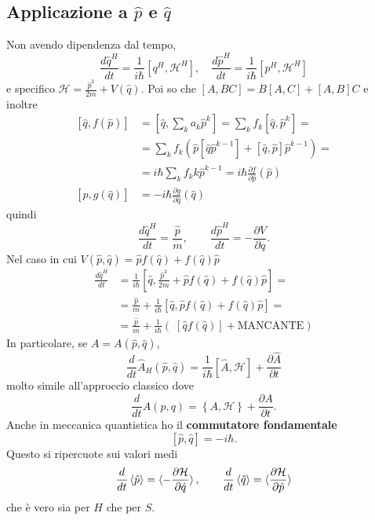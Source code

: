 \subsection{Applicazione a \(\hat{p}\) e \(\hat{q}\)}
Non avendo dipendenza dal tempo,
\[
\frac{d \hat{q}^H}{dt} = \frac{1}{i \hbar} \left[ q^H, \mathcal{H}^H \right], \quad \frac{d \hat{p}^H}{dt} = \frac{1}{i \hbar} \left[ p^H, \mathcal{H}^H \right]
\]
e specifico \( \mathcal{H} = \frac{\hat{p}^2}{2m} + V(\hat{q}) \). Poi so che \( [A, BC] = B[A, C] + [A, B] C \) e inoltre
\begin{align*}
\left[ \hat{q}, f(\hat{p}) \right] &= \left[ \hat{q}, \sum_k a_k \hat{p}^k \right] = \sum_k f_k \left[ \hat{q}, \hat{p}^k \right] = \\
&= \sum_k f_k \left( \hat{p} \left[ \hat{q} \hat{p}^{k - 1} \right] + \left[ \hat{q}, \hat{p} \right] \hat{p}^{k - 1} \right) = \\
&= i \hbar \sum_k f_k k \hat{p}^{k - 1} = i \hbar \frac{\partial f}{\partial \hat{p}} (\hat{p}) \\
\left[ \hat{p}, g(\hat{q}) \right] &= - i \hbar \frac{\partial g}{\partial \hat{q}}(\hat{q})
\end{align*}
quindi
\[
\frac{d \hat{q}^H}{dt} = \frac{\hat{p}}{m}, \qquad \frac{d \hat{p}^H}{dt} = -\frac{\partial V}{\partial q}.
\]
Nel caso in cui \( V(\hat{p}, \hat{q}) = \hat{p} f(\hat{q}) + f(\hat{q})\hat{p} \)
\begin{align*}
\frac{d\hat{q}^H}{dt} &= \frac{1}{i \hbar} \left[ \hat{q}, \frac{\hat{p}^2}{2m} + \hat{p} f(\hat{q}) + f(\hat{q})\hat{p} \right] = \\
&= \frac{\hat{p}}{m} + \frac{1}{i \hbar} \left[ \hat{q}, \hat{p} f(\hat{q}) + f(\hat{q})\hat{p} \right] = \\
&= \frac{\hat{p}}{m} + \frac{1}{i \hbar} \left( \; \left[ \hat{q} f(\hat{q}) \right] + \text{MANCANTE} \right)
\end{align*}
In particolare, se \( A = A(\hat{p}, \hat{q}) \),
\[
\frac{d}{dt} \hat{A}_H(\hat{p}, \hat{q}) = \frac{1}{i \hbar} \left[ \hat{A}, \mathcal{H} \right] + \frac{\partial \hat{A}}{\partial t}
\]
molto simile all'approccio classico dove
\[
\frac{d}{dt} A(p, q) = \left\{ A, \mathcal{H} \right\} + \frac{\partial A}{\partial t}.
\]
Anche in meccanica quantistica ho il \textbf{commutatore fondamentale}
\[
\left[ \hat{p}, \hat{q} \right] = -i \hbar.
\]
Questo si ripercuote sui valori medi
\[
\frac{d}{dt} \braket{\hat{p}} = \braket{-\frac{\partial \mathcal{H}}{\partial \hat{q}}}, \qquad \frac{d}{dt} \braket{\hat{q}} = \braket{\frac{\partial \mathcal{H}}{\partial \hat{p}}}
\]
che è vero sia per \( H \) che per \( S \).

